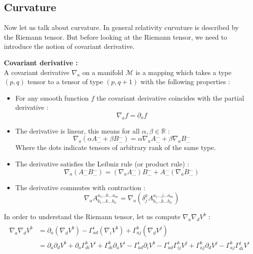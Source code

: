 \documentclass[a4paper,12pt]{article}
\theoremstyle{definition}
\begin{document}
\subsection{Curvature}
Now let us talk about curvature. In general relativity curvature is described by the Riemann tensor.
But before looking at the Riemann tensor, we need to introduce the notion of covariant derivative.
\begin{definition}
	\textbf{Covariant derivative :}\\
	A covariant derivative $\nabla_a$ on a manifold $\mathcal{M}$ is a mapping which takes a type $(p,q)$ tensor to a tensor of type $(p,q+1)$ with the following properties :
	\begin{itemize}
		\item For any smooth function $f$ the covariant derivative coincides with the partial derivative :
		\begin{equation}
			\nabla_af=\partial_af
		\end{equation}
		\item The derivative is linear, this means for all $\alpha,\beta \in \mathbb{R}$ :
		\begin{equation}
			\nabla_a(\alpha A^{...}_{...}+\beta B^{...}_{...})=\alpha \nabla_a A^{...}_{...}+\beta\nabla_a B^{...}_{...}
		\end{equation}
		Where the dots indicate tensors of arbitrary rank of the same type.
		\item The derivative satisfies the Leibniz rule (or product rule) :
		\begin{equation}
			\nabla_a(A^{...}_{...}B^{...}_{...})=(\nabla_aA^{...}_{...})B^{...}_{...}+A^{...}_{...}(\nabla_aB^{...}_{...})
		\end{equation}
		\item The derivative commutes with contraction :
		\begin{equation}
			\nabla_aA^{a_1...k...a_m}_{b_1...k...b_n}=\nabla_a(\delta^k_jA^{a_1...j...a_m}_{b_1...k...b_n})
		\end{equation}
	\end{itemize}
\end{definition}
In order to understand the Riemann tensor, let us compute $\nabla _a \nabla _d V^b$ :
\begin{align}
\begin{split}
	\nabla _a \nabla _d V^b &= \partial_a(\nabla _d V^b)-\Gamma^i_{ad} (\nabla _i V^b)+\Gamma^b_{aj} (\nabla _d V^j)\\
	&=\partial_a\partial_d V^b+ \partial_a \Gamma^b_{di}V^i+ \Gamma^b_{di}\partial_a V^i - \Gamma^i_{ad}\partial_i V^b
	-\Gamma^i_{ad}\Gamma^b_{ij}V^j+\Gamma^b_{aj}\partial_d V^j-\Gamma^b_{aj}\Gamma^j_{di}V^i
\end{split}
\end{align}
\end{document}
